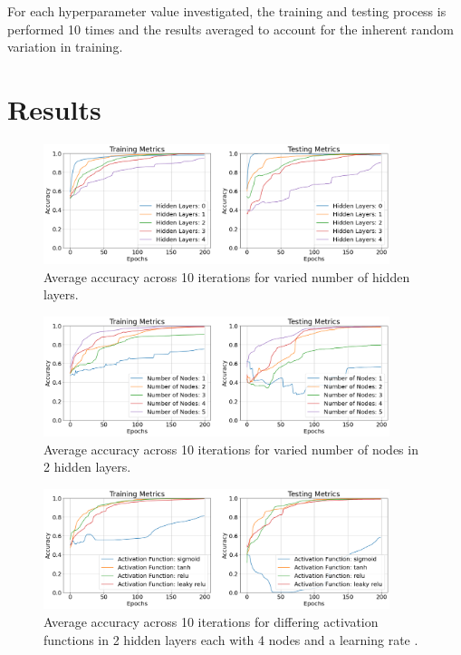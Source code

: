 \documentclass[12pt]{article}
\begin{document}
For each hyperparameter value investigated, the training and testing
process is performed 10 times and the results averaged to account for
the inherent random variation in training.

\vspace{-1.5em}
\section{Results}
\vspace{-1.5em}

\begin{figure}[H]
  \centering
  \includegraphics[width=0.9\textwidth]{figs/layers.png}
  \caption{
    Average accuracy across 10 iterations for varied number of hidden
    layers.
  }
  \label{fig:layers}
\end{figure}

\begin{figure}[H]
  \centering
  \includegraphics[width=0.9\textwidth]{figs/nodes.png}
  \caption{
    Average accuracy across 10 iterations for varied number of nodes
    in 2 hidden layers.
  }
  \label{fig:nodes}
\end{figure}

\begin{figure}[H]
  \centering
  \includegraphics[width=0.9\textwidth]{figs/funcs.png}
  \caption{
    Average accuracy across 10 iterations for differing activation
    functions in 2 hidden layers each with 4 nodes and a learning rate
     .
  }
  \label{fig:funcs}
\end{figure}
\end{document}
